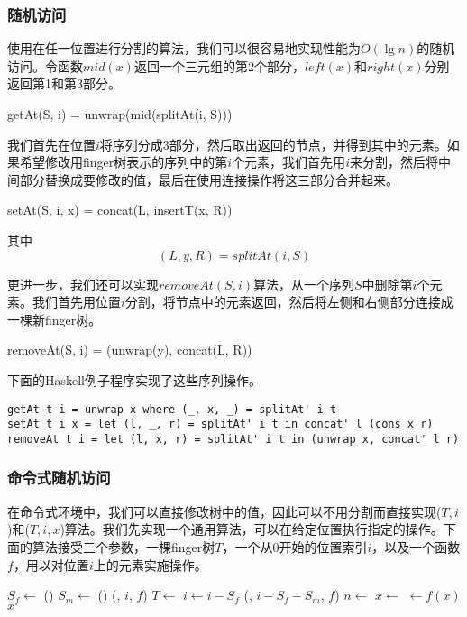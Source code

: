 \documentclass[UTF8]{article}
\begin{document}
\subsubsection{随机访问}

使用在任一位置进行分割的算法，我们可以很容易地实现性能为$O(\lg n)$的随机访问。令函数$mid(x)$返回一个三元组的第2个部分，$left(x)$和$right(x)$分别返回第1和第3部分。

\be
getAt(S, i) = unwrap(mid(splitAt(i, S)))
\ee

我们首先在位置$i$将序列分成3部分，然后取出返回的节点，并得到其中的元素。如果希望修改用finger树表示的序列中的第$i$个元素，我们首先用$i$来分割，然后将中间部分替换成要修改的值，最后在使用连接操作将这三部分合并起来。

\be
setAt(S, i, x) = concat(L, insertT(x, R))
\ee

其中
\[
(L, y, R) = splitAt(i, S)
\]

更进一步，我们还可以实现$removeAt(S, i)$算法，从一个序列$S$中删除第$i$个元素。我们首先用位置$i$分割，将节点中的元素返回，然后将左侧和右侧部分连接成一棵新finger树。

\be
removeAt(S, i) = (unwrap(y), concat(L, R))
\ee

下面的Haskell例子程序实现了这些序列操作。

\lstset{language=Haskell}
\begin{lstlisting}
getAt t i = unwrap x where (_, x, _) = splitAt' i t
setAt t i x = let (l, _, r) = splitAt' i t in concat' l (cons x r)
removeAt t i = let (l, x, r) = splitAt' i t in (unwrap x, concat' l r)
\end{lstlisting}

\subsubsection{命令式随机访问}

在命令式环境中，我们可以直接修改树中的值，因此可以不用分割而直接实现($T, i$)和($T, i, x$)算法。我们先实现一个通用算法，可以在给定位置执行指定的操作。下面的算法接受三个参数，一棵finger树$T$，一个从0开始的位置索引$i$，以及一个函数$f$，用以对位置$i$上的元素实施操作。

\begin{algorithmic}
    \State $S_f \gets $ ()
    \State $S_m \gets $ ()
      \State \Return {}(, $i$, $f$)
      \State $T \gets$ 
      \State $i \gets i - S_f$
    \Else
      \State \Return {}(, $i - S_f - S_m$, $f$)
    \EndIf
  \EndWhile
  \State $n \gets$ 
  \State $x \gets$ 
  \State {} $\gets f(x)$
  \State \Return $x$
\EndFunction
\end{algorithmic}
\end{document}
